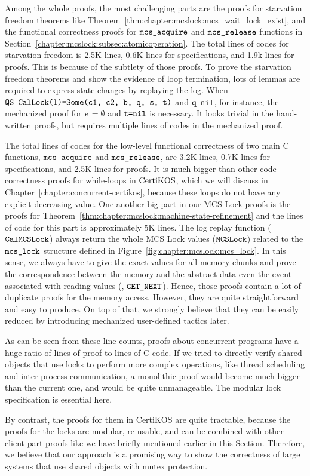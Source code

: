 Among the whole proofs, the most challenging parts are the proofs for starvation 
freedom theorems like Theorem~\ref{thm:chapter:mcslock:mcs_wait_lock_exist}, 
and the functional correctness proofs for ${\mathrm{\texttt{mcs\_acquire}}}$ 
and ${\mathrm{\texttt{mcs\_release}}}$ functions
in Section~\ref{chapter:mcslock:subsec:atomicoperation}.
The total lines of codes for starvation freedom is 2.5K lines, 0.6K lines for specifications, 
and 1.9k lines for proofs. This is because of the subtlety of those proofs. 
To prove the starvation freedom theorems and show the evidence of loop termination,
lots of lemmas are required to express
state changes by replaying the log. 
When ${\mathrm{\texttt{QS\_CalLock(l)=Some(c1, c2, b, q, s, t)}}}$
and ${\mathrm{\texttt{q=nil}}}$, 
for instance, the mechanized proof for ${\mathrm{\texttt{s}}}$$=\emptyset$ 
and ${\mathrm{\texttt{t=nil}}}$ is necessary. It looks trivial in the hand-written proofs, 
but requires multiple lines of codes in the mechanized proof. 

The total lines of codes for the low-level functional correctness
of two main C functions, ${\mathrm{\texttt{mcs\_acquire}}}$ and ${\mathrm{\texttt{mcs\_release}}}$, are 3.2K lines,  
0.7K lines for specifications, and 2.5K lines for proofs.
It is much bigger than other code correctness proofs for while-loops in $\mathrm{CertiKOS}$, which we will
discuss in Chapter~\ref{chapter:concurrent-certikos},
because these loops do not have any explicit decreasing value.
One another big part in our MCS Lock proofs is the proofs for 
Theorem~\ref{thm:chapter:mcslock:machine-state-refinement} and the lines of code for this part is 
approximately 5K lines. The log replay function (${\mathrm{\texttt{CalMCSLock}}}$) always 
return the whole MCS Lock values (${\mathrm{\texttt{MCSLock}}}$) related 
to the  ${\mathrm{\texttt{mcs\_lock}}}$ structure defined in Figure~\ref{fig:chapter:mcslock:mcs_lock}. 
In this sense, we always have to give the exact values for all memory 
chunks and prove the correspondence between the memory and the abstract 
data even the event associated with reading values (\eg, ${\mathrm{\texttt{GET\_NEXT}}}$).
Hence, those proofs contain a lot of duplicate proofs for the memory access. 
However, they are quite straightforward and easy to produce. 
On top of that, we strongly believe 
that they can be easily reduced by introducing mechanized user-defined tactics later. 

As can be seen from these line counts, proofs about concurrent programs
have a huge ratio of lines of proof to lines of C code.
If we tried to directly verify shared objects that use locks to 
perform more complex operations, like thread scheduling
and inter-process communication, a monolithic proof  
would become much bigger than the current one, and would be quite
unmanageable. The modular lock specification is essential here.

By contrast, the proofs for them in CertiKOS are quite tractable, 
because the proofs for the locks are modular, re-usable, and can 
be combined with other client-part proofs like we have briefly 
mentioned earlier in this Section.
Therefore, we believe that our approach is a promising way to 
show the correctness of large systems that use shared objects with mutex protection. 

